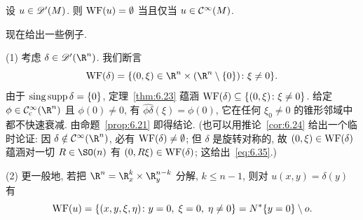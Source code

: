 \begin{corollary}[波前集与光滑性]\label{cor:6.24}
设 $u \in \mathscr{D}'(M)$. 则 $\operatorname{WF}(u) = \emptyset$ 当且仅当 $u \in \mathcal{C}^\infty(M)$.
\end{corollary}

现在给出一些例子.

\begin{example}[$\delta$-分布]\label{eg:6.25}
(1) 考虑 $\delta \in \Distr(\R^n)$. 我们断言
\begin{equation}\label{eq:6.35}
    \WF(\delta) = \{(0, \xi) \in \R^n \times (\R^n \setminus \{0\}) \colon \xi \neq 0\}.
\end{equation}
由于 $\operatorname{sing\,supp} \delta = \{0\}$, 定理~\ref{thm:6.23} 蕴涵 $\operatorname{WF}(\delta) \subseteq \{(0, \xi) \colon \xi \neq 0\}$. 给定 $\phi \in \SmoothComp(\R^n)$ 且 $\phi(0) \neq 0$, 有 $\widehat{\phi\delta}(\xi) = \phi(0)$, 它在任何 $\xi_0 \neq 0$ 的锥形邻域中都不快速衰减. 由命题~\ref{prop:6.21} 即得结论. (也可以用推论~\ref{cor:6.24} 给出一个临时论证: 因 $\delta \notin \Smooth(\R^n)$, 必有 $\operatorname{WF}(\delta) \neq \emptyset$; 但 $\delta$ 是旋转对称的, 故 $(0, \xi) \in \operatorname{WF}(\delta)$ 蕴涵对一切 $R \in \SO(n)$ 有 $(0, R\xi) \in \operatorname{WF}(\delta)$; 这给出~\eqref{eq:6.35}.)

(2) 更一般地, 若把 $\R^n = \R^k_x \times \R^{n-k}_y$ 分解, $k \le n-1$, 则对 $u(x, y) = \delta(y)$ 有
\begin{equation}\label{eq:6.36}
    \operatorname{WF}(u) = \{(x, y, \xi, \eta) \colon y = 0, \; \xi = 0, \; \eta \neq 0\} = N^* \{y = 0\} \setminus o.
\end{equation}
\end{example}

